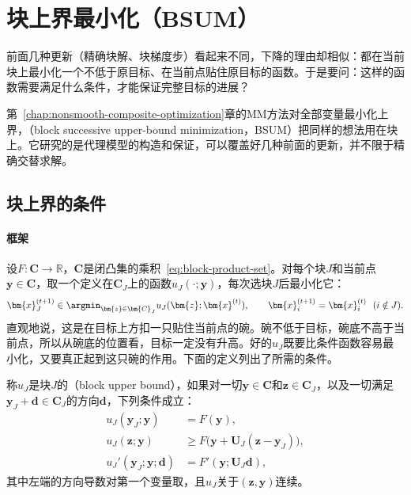 \section{块上界最小化（BSUM）}
\label{sec:block-bsum}

前面几种更新（精确块解、块梯度步）看起来不同，下降的理由却相似：都在当前块上最小化一个不低于原目标、在当前点贴住原目标的函数。于是要问：这样的函数需要满足什么条件，才能保证完整目标的进展？

第~\ref{chap:nonsmooth-composite-optimization}章的MM方法对全部变量最小化上界，（block successive upper-bound minimization，BSUM）把同样的想法用在块上。它研究的是代理模型的构造和保证，可以覆盖好几种前面的更新，并不限于精确交替求解。

\subsection{块上界的条件}
\label{sec:block-bsum-conditions}

\paragraph{框架}
设$F:\bm{C}\to\mathbb{R}$，$\bm{C}$是闭凸集的乘积~\eqref{eq:block-product-set}。对每个块$J$和当前点$\bm{y}\in\bm{C}$，取一个定义在$\bm{C}_J$上的函数$u_J(\cdot;\bm{y})$，每次选块$J$后最小化它：
\begin{equation}
 \bm{x}_J^{(t+1)}\in\argmin_{\bm{z}\in\bm{C}_J}u_J(\bm{z};\bm{x}^{(t)}),\qquad
 \bm{x}_i^{(t+1)}=\bm{x}_i^{(t)}\ \ (i\notin J).
 \label{eq:block-bsum}
\end{equation}
直观地说，这是在目标上方扣一只贴住当前点的碗。碗不低于目标，碗底不高于当前点，所以从碗底的位置看，目标一定没有升高。好的$u_J$既要比条件函数容易最小化，又要真正起到这只碗的作用。下面的定义列出了所需的条件。

\begin{definition}[块上界]
\label{def:block-upper-bound}
称$u_J$是块$J$的（block upper bound），如果对一切$\bm{y}\in\bm{C}$和$\bm{z}\in\bm{C}_J$，以及一切满足$\bm{y}_J+\bm{d}\in\bm{C}_J$的方向$\bm{d}$，下列条件成立：
\begin{align}
 u_J(\bm{y}_J;\bm{y})&=F(\bm{y}),\label{eq:block-ub-equal}\\
 u_J(\bm{z};\bm{y})&\geq F\bigl(\bm{y}+\bm{U}_J(\bm{z}-\bm{y}_J)\bigr),\label{eq:block-ub-upper}\\
 u_J'(\bm{y}_J;\bm{y};\bm{d})&=F'(\bm{y};\bm{U}_J\bm{d}),\label{eq:block-ub-derivative}
\end{align}
其中左端的方向导数对第一个变量取，且$u_J$关于$(\bm{z},\bm{y})$连续。
\end{definition}

